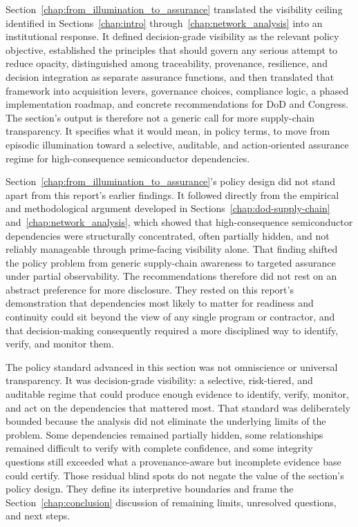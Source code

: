 Section~\ref{chap:from_illumination_to_assurance} translated the visibility ceiling identified in Sections~\ref{chap:intro} through~\ref{chap:network_analysis} into an institutional response. It defined decision-grade visibility as the relevant policy objective, established the principles that should govern any serious attempt to reduce opacity, distinguished among traceability, provenance, resilience, and decision integration as separate assurance functions, and then translated that framework into acquisition levers, governance choices, compliance logic, a phased implementation roadmap, and concrete recommendations for DoD and Congress. The section's output is therefore not a generic call for more supply-chain transparency. It specifies what it would mean, in policy terms, to move from episodic illumination toward a selective, auditable, and action-oriented assurance regime for high-consequence semiconductor dependencies.

Section~\ref{chap:from_illumination_to_assurance}'s policy design did not stand apart from this report's earlier findings. It followed directly from the empirical and methodological argument developed in Sections~\ref{chap:dod-supply-chain} and~\ref{chap:network_analysis}, which showed that high-consequence semiconductor dependencies were structurally concentrated, often partially hidden, and not reliably manageable through prime-facing visibility alone. That finding shifted the policy problem from generic supply-chain awareness to targeted assurance under partial observability. The recommendations therefore did not rest on an abstract preference for more disclosure. They rested on this report's demonstration that dependencies most likely to matter for readiness and continuity could sit beyond the view of any single program or contractor, and that decision-making consequently required a more disciplined way to identify, verify, and monitor them.

The policy standard advanced in this section was not omniscience or universal transparency. It was decision-grade visibility: a selective, risk-tiered, and auditable regime that could produce enough evidence to identify, verify, monitor, and act on the dependencies that mattered most. That standard was deliberately bounded because the analysis did not eliminate the underlying limits of the problem. Some dependencies remained partially hidden, some relationships remained difficult to verify with complete confidence, and some integrity questions still exceeded what a provenance-aware but incomplete evidence base could certify. Those residual blind spots do not negate the value of the section's policy design. They define its interpretive boundaries and frame the Section~\ref{chap:conclusion} discussion of remaining limits, unresolved questions, and next steps.

